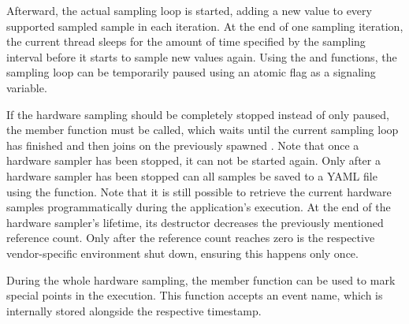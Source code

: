 Afterward, the actual sampling loop is started, adding a new value to every supported sampled sample in each iteration. 
At the end of one sampling iteration, the current thread sleeps for the amount of time specified by the sampling interval before it starts to sample new values again. 
Using the  and  functions, the sampling loop can be temporarily paused using an atomic flag as a signaling variable. 

If the hardware sampling should be completely stopped instead of only paused, the  member function must be called, which waits until the current sampling loop has finished and then joins on the previously spawned . 
Note that once a hardware sampler has been stopped, it can not be started again. 
Only after a hardware sampler has been stopped can all samples be saved to a YAML file using the  function. 
Note that it is still possible to retrieve the current hardware samples programmatically during the application's execution. 
At the end of the hardware sampler's lifetime, its destructor decreases the previously mentioned reference count. 
Only after the reference count reaches zero is the respective vendor-specific environment shut down, ensuring this happens only once. 

During the whole hardware sampling, the  member function can be used to mark special points in the execution. 
This function accepts an event name, which is internally stored alongside the respective timestamp. 




